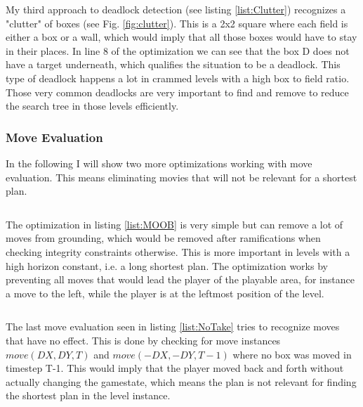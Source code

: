 \documentclass{report}
\begin{document}

\begin{lstlisting}[caption={Clutter},label=list:Clutter]
\end{lstlisting}

My third approach to deadlock detection (see listing \ref{list:Clutter}) recognizes a "clutter" of boxes (see Fig. \ref{fig:clutter}). This is a 2x2 square where each field is either a box or a wall, which would imply that all those boxes would have to stay in their places. In line 8 of the optimization we can see that the box D does not have a target underneath, which qualifies the situation to be a deadlock. This type of deadlock happens a lot in crammed levels with a high box to field ratio. Those very common deadlocks are very important to find and remove to reduce the search tree in those levels efficiently.

\subsubsection{Move Evaluation}

In the following I will show two more optimizations working with move evaluation. This means eliminating movies that will not be relevant for a shortest plan.


\begin{lstlisting}[caption={Moves out of Bounds},label=list:MOOB]
\end{lstlisting}

The optimization in listing \ref{list:MOOB} is very simple but can remove a lot of moves from grounding, which would be removed after ramifications when checking integrity constraints otherwise. This is more important in levels with a high horizon constant, i.e. a long shortest plan. The optimization works by preventing all moves that would lead the player of the playable area, for instance a move to the left, while the player is at the leftmost position of the level.


\begin{lstlisting}[caption={No Taking back Moves},label=list:NoTake]
\end{lstlisting}

The last move evaluation seen in listing \ref{list:NoTake} tries to recognize moves that have no effect. This is done by checking for move instances $move(DX,DY,T)$ and $move(-DX,-DY,T-1)$ where no box was moved in timestep T-1. This would imply that the player moved back and forth without actually changing the gamestate, which means the plan is not relevant for finding the shortest plan in the level instance.
\end{document}
